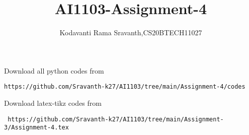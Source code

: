 \documentclass[journal,12pt,twocolumn]{IEEEtran}
\DeclareMathOperator*{\Res}{Res}
\begin{document}
\newcommand{\BEQA}{\begin{eqnarray}}
\newcommand{\EEQA}{\end{eqnarray}}
\newcommand{\define}{\stackrel{\triangle}{=}}

\raggedbottom
\setlength{\parindent}{0pt}
\providecommand{\mbf}{\mathbf}
\providecommand{\pr}[1]{\ensuremath{\Pr\left(#1\right)}}
\providecommand{\qfunc}[1]{\ensuremath{Q\left(#1\right)}}
\providecommand{\sbrak}[1]{\ensuremath{{}\left[#1\right]}}
\providecommand{\lsbrak}[1]{\ensuremath{{}\left[#1\right.}}
\providecommand{\rsbrak}[1]{\ensuremath{{}\left.#1\right]}}
\providecommand{\brak}[1]{\ensuremath{\left(#1\right)}}
\providecommand{\lbrak}[1]{\ensuremath{\left(#1\right.}}
\providecommand{\rbrak}[1]{\ensuremath{\left.#1\right)}}
\providecommand{\cbrak}[1]{\ensuremath{\left\{#1\right\}}}
\providecommand{\lcbrak}[1]{\ensuremath{\left\{#1\right.}}
\providecommand{\rcbrak}[1]{\ensuremath{\left.#1\right\}}}
\theoremstyle{remark}
\newtheorem{rem}{Remark}
\newcommand{\sgn}{\mathop{\mathrm{sgn}}}
\providecommand{\abs}[1]{\vert#1\vert}
\providecommand{\res}[1]{\Res\displaylimits_{#1}} 
\providecommand{\norm}[1]{\lVert#1\rVert}
\providecommand{\mtx}[1]{\mathbf{#1}}
\providecommand{\mean}[1]{E[ #1 ]}
\providecommand{\fourier}{\overset{\mathcal{F}}{ \rightleftharpoons}}
\providecommand{\system}{\overset{\mathcal{H}}{ \longleftrightarrow}}
\newcommand{\solution}{\noindent \textbf{Solution: }}
\newcommand{\cosec}{\,\text{cosec}\,}
\providecommand{\dec}[2]{\ensuremath{\overset{#1}{\underset{#2}{\gtrless}}}}
\newcommand{\myvec}[1]{\ensuremath{\begin{pmatrix}#1\end{pmatrix}}}
\newcommand{\mydet}[1]{\ensuremath{\begin{vmatrix}#1\end{vmatrix}}}
\makeatletter
{}
\makeatother
\let\StandardTheFigure\thefigure
\let\vec\mathbf
\renewcommand{\thefigure}{\theproblem}
\def\putbox#1#2#3{\makebox[0in][l]{\makebox[#1][l]{}\raisebox{\baselineskip}[0in][0in]{\raisebox{#2}[0in][0in]{#3}}}}
     \def\rightbox#1{\makebox[0in][r]{#1}}
     \def\centbox#1{\makebox[0in]{#1}}
     \def\topbox#1{\raisebox{-\baselineskip}[0in][0in]{#1}}
     \def\midbox#1{\raisebox{-0.5\baselineskip}[0in][0in]{#1}}
\vspace{3cm}
\title{AI1103-Assignment-4}
\author{Kodavanti Rama Sravanth,CS20BTECH11027}
\maketitle
\newpage
\bigskip
\renewcommand{\thefigure}{\theenumi}
\renewcommand{\thetable}{\theenumi}
Download all python codes from 
\begin{lstlisting}
https://github.com/Sravanth-k27/AI1103/tree/main/Assignment-4/codes
\end{lstlisting}
%
Download latex-tikz codes from 
%
\begin{lstlisting}
 https://github.com/Sravanth-k27/AI1103/tree/main/Assignment-3/Assignment-4.tex 
\end{lstlisting}
\end{document}
